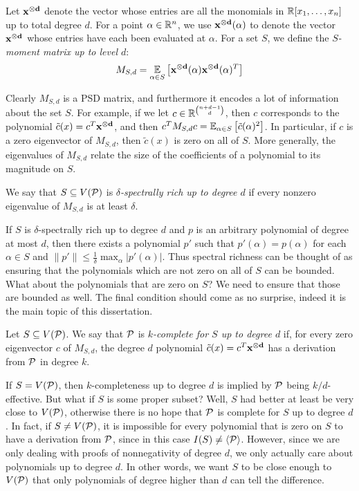 \begin{definition}
Let $\mathbf{x^{\otimes d}}$ denote the vector whose entries are all the monomials in $\mathbb R[x_1,\dots,x_n]$ up to total degree $d$. 
For a point $\alpha \in \mathbb R^n$, we use $\mathbf{x^{\otimes d}}(\alpha)$ to denote the vector $\mathbf{x^{\otimes d}}$ whose entries have each been evaluated at $\alpha$.
For a set $S$, we define the \emph{$S$-moment matrix up to level $d$}:
\[M_{S,d} = \operatorname*{\mathbb{E}}_{\alpha \in S}\left[\mathbf{x^{\otimes d}}(\alpha)\mathbf{x^{\otimes d}}(\alpha)^T\right]\]
\end{definition}
Clearly $M_{S,d}$ is a PSD matrix, and furthermore it encodes a lot of information about the set $S$. For example, if we let $c \in \mathbb R^{\binom{n+d-1}{d}}$, then $c$ corresponds to the polynomial $\tilde{c}(x) = c^T\mathbf{x^{\otimes d}}$, and then $c^TM_{S,d}c = \operatorname*{\mathbb{E}}_{\alpha \in S}\left[\tilde{c}(\alpha)^2\right]$.
In particular, if $c$ is a zero eigenvector of $M_{S,d}$, then $\tilde{c}(x)$ is zero on all of $S$. 
More generally, the eigenvalues of $M_{S,d}$ relate the size of the coefficients of a polynomial to its magnitude on $S$. 
\begin{definition}
We say that $S \subseteq V(\mathcal P)$ is \emph{$\delta$-spectrally rich up to degree $d$} if every nonzero eigenvalue of $M_{S,d}$ is at least $\delta$. 
\end{definition}
If $S$ is $\delta$-spectrally rich up to degree $d$ and $p$ is an arbitrary polynomial of degree at most $d$, then there exists a polynomial $p'$ such that $p'(\alpha) = p(\alpha)$ for each $\alpha \in S$ and $\|p'\| \leq \frac{1}{\delta} \max_\alpha |p'(\alpha)|$. Thus spectral richness can be thought of as ensuring that the polynomials which are not zero on all of $S$ can be bounded. What about the polynomials that are zero on $S$? We need to ensure that those are bounded as well. The final condition should come as no surprise, indeed it is the main topic of this dissertation. 
\begin{definition}
Let $S \subseteq V(\mathcal P)$. We say that $\mathcal P$ is \emph{$k$-complete for $S$ up to degree $d$} if, for every zero eigenvector $c$ of $M_{S,d}$, the degree $d$ polynomial $\tilde{c}(x) = c^T\mathbf{x^{\otimes d}}$ has a derivation from $\mathcal P$ in degree $k$.
\end{definition}
If $S = V(\mathcal P)$, then $k$-completeness up to degree $d$ is implied by $\mathcal P$ being $k/d$-effective. 
But what if $S$ is some proper subset? Well, $S$ had better at least be very close to $V(\mathcal P)$, otherwise there is no hope that $\mathcal P$ is complete for $S$ up to degree $d$. In fact, if $S \neq V(\mathcal P)$, it is impossible for every polynomial that is zero on $S$ to have a derivation from $\mathcal P$, since in this case $I(S) \neq \langle \mathcal P \rangle$. However, since we are only dealing with proofs of nonnegativity of degree $d$, we only actually care about polynomials up to degree $d$. In other words, we want $S$ to be close enough to $V(\mathcal P)$ that only polynomials of degree higher than $d$ can tell the difference.
